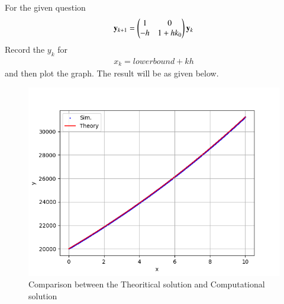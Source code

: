\documentclass[journal]{IEEEtran}
\begin{document}
For the given question\\
\begin{align}
	\mathbf{y}_{k+1} = \begin{pmatrix}1 & 0\\ -h & 1+hk_0\end{pmatrix}\mathbf{y}_k
\end{align}
Record the $y_k$ for 
\begin{align}
x_k =lowerbound+kh
\end{align}
and then plot the graph. The result will be as given below.
\begin{figure}[h!]
   \centering
   \includegraphics[width=\columnwidth]{figs/fig.png}
   \caption{Comparison between the Theoritical solution and Computational solution}
   \label{stemplot}
\end{figure}
\end{document}
